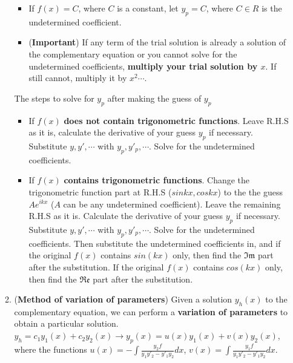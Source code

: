 \documentclass[10pt, landscape]{article}
\begin{document}
\begin{multicols}{4}
\begin{enumerate}
\begin{enumerate}
\begin{itemize}
            \item If $f(x)=C$, where $C$ is a constant, let $y_p=C$, where $C\in R$ is the undetermined coefficient.
            \item (\textbf{Important}) If any term of the trial solution is already a solution of the complementary equation or you cannot solve for the undetermined coefficients, \textbf{multiply your trial solution by $x$}. If still cannot, multiply it by $x^2\cdots$.
        \end{itemize}
        The steps to solve for $y_p$ after making the guess of $y_p$
        \begin{itemize}
            \item If $f(x)$ \textbf{does not contain trigonometric functions}. Leave R.H.S as it is, calculate the derivative of your guess $y_p$ if necessary. Substitute $y, y', \cdots$ with $y_p, y'_p, \cdots$. Solve for the undetermined coefficients.
            \item If $f(x)$ \textbf{contains trigonometric functions}. Change the trigonometric function part at R.H.S ($sinkx, coskx$) to the the guess $Ae^{ikx}$ ($A$ can be any undetermined coefficient). Leave the remaining R.H.S as it is. Calculate the derivative of your guess $y_p$ if necessary. Substitute $y, y', \cdots$ with $y_p, y'_p, \cdots$. Solve for the undetermined coefficients. Then substitute the undetermined coefficients in, and if the original $f(x)$ contains $sin(kx)$ only, then find the $\Im\mathfrak{m}$ part after the substitution. If the original $f(x)$ contains $cos(kx)$ only, then find the $\Re\mathfrak{e}$ part after the substitution.
        \end{itemize}
        \item (\textbf{Method of variation of parameters}) Given a solution $y_h(x)$ to the complementary equation, we can perform a \textbf{variation of parameters} to obtain a particular solution. $y_h=c_1y_1(x)+c_2y_2(x)\rightarrow y_p(x)=u(x)y_1(x)+v(x)y_2(x)$, where the functions $u(x)=-\int \frac{y_2f}{y_1y'_2-y'_1y_2}dx$, $v(x)=\int \frac{y_1f}{y_1y'_2-y'_1y_2}dx$.
    \end{enumerate}
\end{enumerate}
\end{multicols}

\hrulefill \\

\begin{multicols}{3}
\end{multicols}
\end{document}
